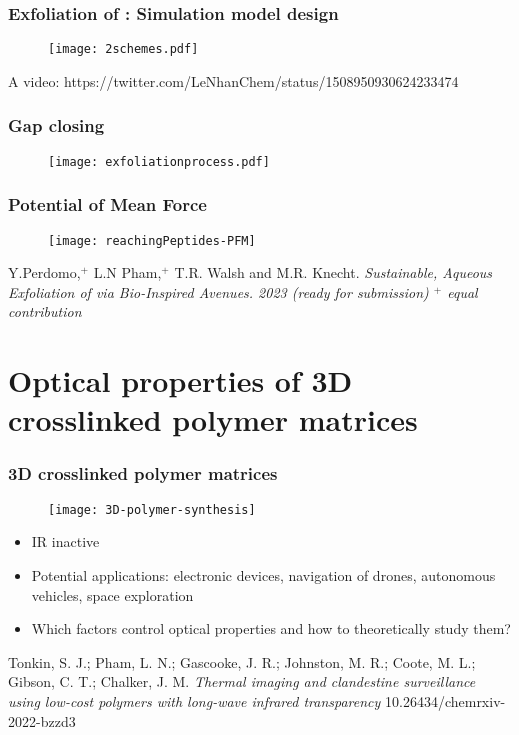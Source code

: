 \documentclass[xcolor=table,aspectratio=169]{beamer}
\begin{document}
\begin{frame}
	\frametitle{Exfoliation of : Simulation model design}
	\begin{figure}
		\texttt{[image: 2schemes.pdf]}
	\end{figure}
	A video: https://twitter.com/LeNhanChem/status/1508950930624233474

\end{frame}

\begin{frame}
	\frametitle{Gap closing}
	\begin{figure}
		\texttt{[image: exfoliationprocess.pdf]}
	\end{figure}

\end{frame}



\begin{frame}
	\frametitle{Potential of Mean Force}
	\begin{figure}
		\texttt{[image: reachingPeptides-PFM]}
	\end{figure}
	\tiny{Y.Perdomo,$^+$ L.N Pham,$^+$ T.R. Walsh and M.R.
		Knecht. \emph{Sustainable, Aqueous Exfoliation of  via Bio-Inspired Avenues.
			2023 (ready for submission) $^+$ equal contribution}}
\end{frame}


\section[3D crosslinked polymer matrices]{Optical properties of 3D crosslinked polymer matrices}

\begin{frame}
	\frametitle{3D crosslinked polymer matrices}
	\begin{figure}
		\texttt{[image: 3D-polymer-synthesis]}
	\end{figure}
	\begin{itemize}
		\item IR inactive
		\item Potential applications: electronic devices, navigation of drones, autonomous vehicles, space exploration
		\item Which factors control optical properties and how to theoretically study them?
	\end{itemize}
	\tiny{Tonkin, S. J.; Pham, L. N.; Gascooke, J. R.; Johnston, M. R.; Coote, M. L.; Gibson, C. T.; Chalker, J. M.
		\emph{Thermal imaging and clandestine surveillance using low-cost polymers with long-wave infrared transparency} 10.26434/chemrxiv-2022-bzzd3}
\end{frame}
\end{document}
